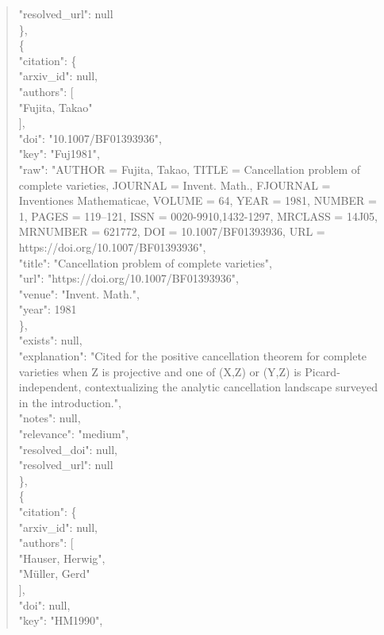 \documentclass[11pt]{article}
\begin{document}
\begin{quote}
      "resolved\_url": null\\
    \},\\
    \{\\
      "citation": \{\\
        "arxiv\_id": null,\\
        "authors": [\\
          "Fujita, Takao"\\
        ],\\
        "doi": "10.1007/BF01393936",\\
        "key": "Fuj1981",\\
        "raw": "AUTHOR = Fujita, Takao, TITLE = Cancellation problem of complete varieties, JOURNAL = Invent. Math., FJOURNAL = Inventiones Mathematicae, VOLUME = 64, YEAR = 1981, NUMBER = 1, PAGES = 119--121, ISSN = 0020-9910,1432-1297, MRCLASS = 14J05, MRNUMBER = 621772, DOI = 10.1007/BF01393936, URL = https://doi.org/10.1007/BF01393936",\\
        "title": "Cancellation problem of complete varieties",\\
        "url": "https://doi.org/10.1007/BF01393936",\\
        "venue": "Invent. Math.",\\
        "year": 1981\\
      \},\\
      "exists": null,\\
      "explanation": "Cited for the positive cancellation theorem for complete varieties when Z is projective and one of (X,Z) or (Y,Z) is Picard-independent, contextualizing the analytic cancellation landscape surveyed in the introduction.",\\
      "notes": null,\\
      "relevance": "medium",\\
      "resolved\_doi": null,\\
      "resolved\_url": null\\
    \},\\
    \{\\
      "citation": \{\\
        "arxiv\_id": null,\\
        "authors": [\\
          "Hauser, Herwig",\\
          "Müller, Gerd"\\
        ],\\
        "doi": null,\\
        "key": "HM1990",\\

\end{quote}
\end{document}
